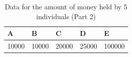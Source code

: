 \begin{table}[ht]
	\centering
	\caption{Data for the amount of money held by 5 individuals (Part 2)}
	\begin{tabular}{lllll}
		A     & B     & C     & D     & E      \\\hline
		10000 & 10000 & 20000 & 25000 & 100000 \\
	\end{tabular}
	\label{tbl::04_01}
\end{table}
